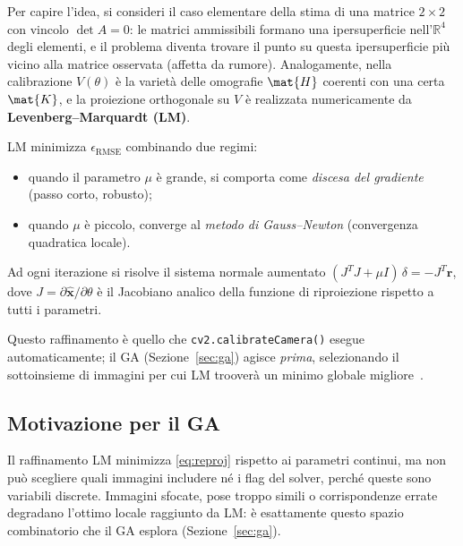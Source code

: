 Per capire l'idea, si consideri il caso elementare della stima di una
matrice \(2\times2\) con vincolo \(\det A=0\): le matrici ammissibili
formano una ipersuperficie nell'\(\mathbb{R}^4\) degli elementi,
e il problema diventa trovare il punto su questa ipersuperficie più
vicino alla matrice osservata (affetta da rumore).  Analogamente,
nella calibrazione \(V(\theta)\) è la varietà delle omografie
\(\mat{H}\) coerenti con una certa \(\mat{K}\), e la proiezione
orthogonale su \(V\) è realizzata numericamente da
\textbf{Levenberg--Marquardt (LM)}.

LM minimizza \(\epsilon_{\text{RMSE}}\) combinando due regimi:
\begin{itemize}
  \item quando il parametro \(\mu\) è grande, si comporta come
        \emph{discesa del gradiente} (passo corto, robusto);
  \item quando \(\mu\) è piccolo, converge al \emph{metodo di
        Gauss--Newton} (convergenza quadratica locale).
\end{itemize}
Ad ogni iterazione si risolve il sistema normale aumentato
\((J^T J + \mu I)\,\delta = -J^T\mathbf{r}\),
dove \(J=\partial\hat{\mathbf{x}}/\partial\theta\) è il Jacobiano
analico della funzione di riproiezione rispetto a tutti i parametri.

Questo raffinamento è quello che \texttt{cv2.calibrateCamera()}
esegue automaticamente; il GA (Sezione~\ref{sec:ga}) agisce
\emph{prima}, selezionando il sottoinsieme di immagini per cui LM
trooverà un minimo globale migliore~\cite[Sez.~5.1]{HZ2004}.

\subsection{Motivazione per il GA}

Il raffinamento LM minimizza \eqref{eq:reproj} rispetto ai parametri
continui, ma non può scegliere quali immagini includere né i flag
del solver, perché queste sono variabili discrete. Immagini sfocate,
pose troppo simili o corrispondenze errate degradano l'ottimo locale
raggiunto da LM: è esattamente questo spazio combinatorio che il GA
esplora (Sezione~\ref{sec:ga}).
